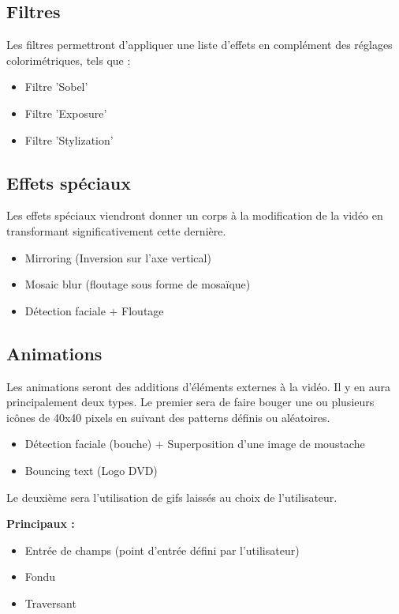 \subsection{Filtres}

Les filtres permettront d'appliquer une liste d'effets en complément des réglages colorimétriques, tels que :

\begin{itemize}
  \item Filtre 'Sobel'
  \item Filtre 'Exposure'
  \item Filtre 'Stylization'
\end{itemize}

\subsection{Effets spéciaux}

Les effets spéciaux viendront donner un corps à la modification de la vidéo en transformant significativement cette dernière.

\begin{itemize}
  \item Mirroring (Inversion sur l'axe vertical)
  \item Mosaic blur (floutage sous forme de mosaïque)
  \item Détection faciale + Floutage
\end{itemize}

\subsection{Animations}

Les animations seront des additions d'éléments externes à la vidéo.
Il y en aura principalement deux types.
Le premier sera de faire bouger une ou plusieurs icônes de 40x40 pixels en suivant des patterns définis ou aléatoires.

\begin{itemize}
  \item Détection faciale (bouche) + Superposition d'une image de moustache
  \item Bouncing text (Logo DVD)
\end{itemize}

Le deuxième sera l'utilisation de gifs laissés au choix de l'utilisateur.

\textbf{ Principaux : }

\begin{itemize}
  \item Entrée de champs (point d'entrée défini par l'utilisateur)
  \item Fondu
  \item Traversant
\end{itemize} 

